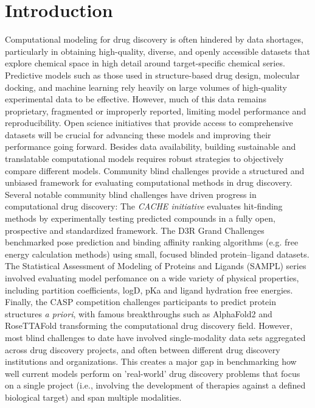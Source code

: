 \documentclass[journal=jcim,manuscript=article]{achemso}
\begin{document}
\section{Introduction}
Computational modeling for drug discovery is often hindered by data shortages, particularly in obtaining high-quality, diverse, and openly accessible datasets that explore chemical space in high detail around target-specific chemical series. Predictive models such as those used in structure-based drug design, molecular docking, and machine learning rely heavily on large volumes of high-quality experimental data to be effective. However, much of this data remains proprietary, fragmented or improperly reported, limiting model performance and reproducibility. Open science initiatives that provide access to comprehensive datasets will be crucial for advancing these models and improving their performance going forward. 
Besides data availability, building sustainable and translatable computational models requires robust strategies to objectively compare different models. Community blind challenges provide a structured and unbiased framework for evaluating computational methods in drug discovery. Several notable community blind challenges have driven progress in computational drug discovery: 
The \textit{CACHE initiative}\cite{ackloo_al-awar_amaro_arrowsmith_azevedo_al._2022} evaluates hit-finding methods by experimentally testing predicted compounds in a fully open, prospective and standardized framework. The D3R Grand Challenges\cite{parks_gaieb_chiu_yang_shao_walters_jansen_mcgaughey_lewis_bembenek_et} benchmarked pose prediction and binding affinity ranking algorithms (e.g. free energy calculation methods) using small, focused blinded protein–ligand datasets. The Statistical Assessment of Modeling of Proteins and Ligands (SAMPL) series\cite{amezcua_setiadi_mobley_2024} involved evaluating model perfomance on a wide variety of physical properties, including partition coefficients, logD, pKa and ligand hydration free energies. Finally, the CASP competition\cite{andriy_kryshtafovych_schwede_topf_krzysztof_2019} challenges participants to predict protein structures \textit{ a priori}, with famous breakthroughs such as AlphaFold2 and RoseTTAFold transforming the computational drug discovery field.\cite{jumper_evans_pritzel_green_figurnov_ronneberger_tunyasuvunakool_bates_žídek_2021, baek_2021} However, most blind challenges to date have involved single-modality data sets aggregated across drug discovery projects, and often between different drug discovery institutions and organizations. This creates a major gap in benchmarking how well current models perform on 'real-world' drug discovery problems that focus on a single project (i.e., involving the development of therapies against a defined biological target) and span multiple modalities. 
\end{document}
